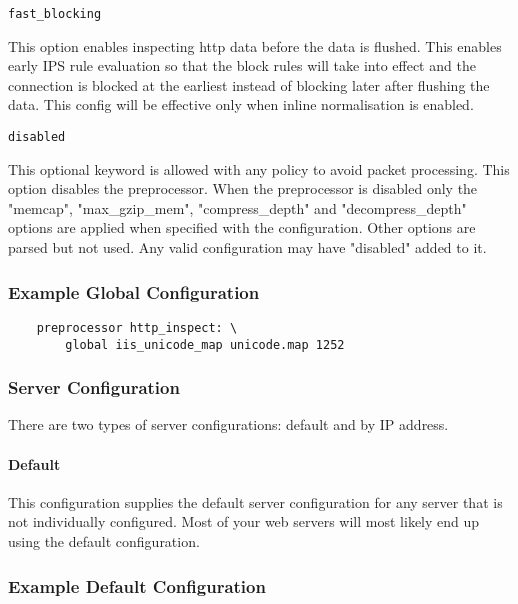 \documentclass[english]{report}
\newcounter{slistnum}
\newenvironment{slist}
{ \begin{list}{ {\bf \arabic{slistnum}.} }{\usecounter{slistnum} } }
{ \end{list} }
\newenvironment{note}{
\samepage
    \vspace{10pt}{\textsf{
        {\hspace{7pt}\Huge{$\triangle$\hspace{-12.5pt}{\Large{$^!$}}}}\hspace{5pt}
        {\Large{NOTE}}
    }
    }
   \begin{center}
    \par\vspace{-17pt}

    \begin{lrbox}{\savepar}
    \begin{minipage}[r]{6in}
}
{
    \end{minipage}
    \end{lrbox}
    \fbox{
        \usebox{
            \savepar
	}
    }
    \par\vskip10pt
    \end{center}
}
\newenvironment{note}{
        \begin{rawhtml}
        <p><table border="1"><tr><td><b>
        Note:&nbsp;&nbsp;</b>
        \end{rawhtml}
}{
        \begin{rawhtml}
        </b></td></tr></table></p>
        \end{rawhtml}
}
\begin{document}
\begin{slist}
\begin {note}
\end{note}

\item \texttt{fast\_blocking}

This option enables inspecting http data before the data is flushed. This enables early IPS rule
evaluation so that the block rules will take into effect and the connection is blocked at the earliest
instead of blocking later after flushing the data. This config will be effective only when inline
normalisation is enabled.

\item \texttt{disabled}

This optional keyword is allowed with any policy to avoid packet processing.
This option disables the preprocessor. When the preprocessor is disabled
only the "memcap", "max\_gzip\_mem", "compress\_depth" and "decompress\_depth" 
options are applied when specified with the configuration. Other options are
parsed but not used. Any valid configuration may have "disabled" added to it.

\end{slist}
\subsubsection{Example Global Configuration}

\begin{verbatim}
    preprocessor http_inspect: \
        global iis_unicode_map unicode.map 1252
\end{verbatim}

\subsubsection{Server Configuration}

There are two types of server configurations: default and by IP address.

\paragraph{Default}

This configuration supplies the default server configuration for any server
that is not individually configured.  Most of your web servers will most likely
end up using the default configuration.

\subsubsection{Example Default Configuration}
\end{document}
